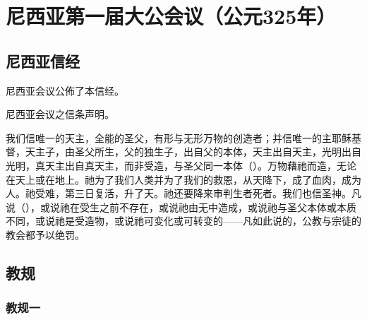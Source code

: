 
\chapter{尼西亚第一届大公会议（公元325年）}



\section{尼西亚信经}

尼西亚会议公佈了本信经。\par

尼西亚会议之信条声明。\par

我们信唯一的天主，全能的圣父，有形与无形万物的创造者；并信唯一的主耶稣基督，天主子，由圣父所生，父的独生子，出自父的本体，天主出自天主，光明出自光明，真天主出自真天主，而非受造，与圣父同一本体（）。万物藉祂而造，无论在天上或在地上。祂为了我们人类并为了我们的救恩，从天降下，成了血肉，成为人。祂受难，第三日复活，升了天。祂还要降来审判生者死者。我们也信圣神。凡说（），或说祂在受生之前不存在，或说祂由无中造成，或说祂与圣父本体或本质不同，或说祂是受造物，或说祂可变化或可转变的——凡如此说的，公教与宗徒的教会都予以绝罚。\par


\section{教规}


\subsection{教规一}

